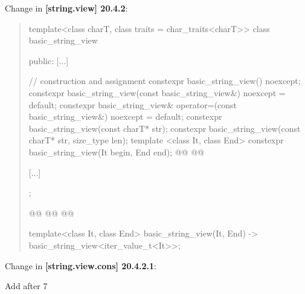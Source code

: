 \documentclass{wg21}
\begin{document}
Change in \textbf{[string.view] 20.4.2}:
\begin{quote}
\begin{codeblock}

template<class charT, class traits = char_traits<charT>>
class basic_string_view {
public:
    [...]

    // construction and assignment
    constexpr basic_string_view() noexcept;
    constexpr basic_string_view(const basic_string_view&) noexcept = default;
    constexpr basic_string_view& operator=(const basic_string_view&) noexcept = default;
    constexpr basic_string_view(const charT* str);
    constexpr basic_string_view(const charT* str, size_type len);
    template <class It, class End>
    constexpr basic_string_view(It begin, End end);
    @@
    @@
    

    [...]
};

@@
@@
@@

template<class It, class End>
basic_string_view(It, End) -> basic_string_view<iter_value_t<It>>;




\end{codeblock}
\end{quote}

Change in \textbf{[string.view.cons] 20.4.2.1}:

Add after 7
\end{document}
